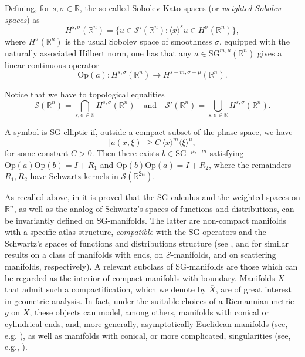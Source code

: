 \documentclass[11pt,reqno]{amsart}
\numberwithin{equation}{section}
\newcommand{\R}{{\mathbb{R}}} %
\newcommand{\Op}{{\mathrm{Op}}}
\newcommand{\SG}{{\mathrm{SG}}}
\begin{document}
Defining, for $s,\sigma\in\R$, the so-called Sobolev-Kato spaces (or \textit{weighted Sobolev spaces}) as
%
\[
  H^{s,\sigma}(\R^n)=\{u\in\mathcal S'(\R^n): \langle{x}\rangle^{s}u\in H^\sigma(\R^n)\},
\]
%
where $H^\sigma(\R^n)$ is the usual Sobolev space of smoothness $\sigma$, equipped
with the naturally associated Hilbert norm, one has that any $a\in \SG^{m,\mu}(\R^n)$ gives a linear continuous operator
%
\[
	\Op(a)\colon H^{s,\sigma}(\R^n)\to H^{s-m,\sigma-\mu}(\R^n).
\]

Notice that we have to topological equalities
%
\[
	\mathcal{S}(\R^n)=\bigcap_{s,\sigma\in\R}H^{s,\sigma}(\R^n)
	\quad\text{and}\quad
	\mathcal{S}'(\R^n)=\bigcup_{s,\sigma\in\R}H^{s,\sigma}(\R^n).	
\]

A symbol is SG-elliptic if, outside a compact subset of the phase space, we have
%
\begin{equation}\label{eq:sgell}
  |a(x,\xi)|\geq C\,\langle x\rangle^{m}\langle \xi\rangle^{\mu},
\end{equation}
for some constant $C>0$. Then there exists $b\in \SG^{-\mu,-m}$ satisfying $\Op(a)\Op(b)=I+R_1$ and $\Op(b)\Op(a)=I+R_2$, where the remainders $R_1,R_2$ have Schwartz kernels in $\mathcal S(\R^{2n})$.  

As recalled above, in \cite{Schrohe86} it is proved that the SG-calculus and the weighted spaces on $\R^n$, as well as the analog of Schwartz's spaces of functions and 
distributions, can be invariantly defined on SG-manifolds. 
The latter are non-compact manifolds with 
a specific atlas structure, \textit{compatible} with the SG-operators and the Schwartz's spaces of functions and distributions structure (see \cite{MP2002},
\cite[Ch. 4]{cordes} and \cite{Melrose_GST} for similar results on a class of manifolds with ends, on $\mathcal{S}$-manifolds, and on scattering manifolds,
respectively). 
A relevant subclass of SG-manifolds are those which can be 
regarded as the interior of compact manifolds with boundary. Manifolds $X$ that admit such a compactification, which we denote by $\overline{X}$, 
are of great interest in geometric analysis. In fact, under the suitable choices of a Riemannian metric $g$ on $X$, these objects can model, among others, 
manifolds with conical or cylindrical ends, and, more generally, asymptotically Euclidean manifolds 
(see, e.g. \cite{cordes,Krainer,Melrose_GST,Melrose_SST}), as well as manifolds with conical, or more complicated, singularities 
(see, e.g., \cite{EgSchu97,LauterSeiler2001,Loya1998,Mazzeo1991,Melrose_APS,Melrose1981,SchulzeBook98}). 
\end{document}
